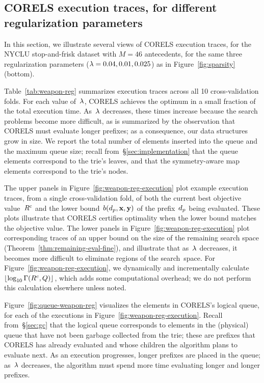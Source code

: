 \subsection{CORELS execution traces, for different regularization parameters}
\label{sec:reg-param}
In this section, we illustrate several views of CORELS execution traces,
for the NYCLU stop-and-frisk dataset with ${M = 46}$ antecedents,
for the same three regularization parameters (${{\lambda} = 0.04, 0.01, 0.025}$)
as in Figure~\ref{fig:sparsity} (bottom).

Table~\ref{tab:weapon-reg} summarizes execution traces across all 10 cross-validation folds.
%
For each value of~${\lambda}$, CORELS achieves the optimum in a small fraction of the total execution time.
%
As~${\lambda}$ decreases, these times increase because the search problems become more difficult,
as is summarized by the observation that CORELS must evaluate longer prefixes;
as a consequence, our data structures grow in size.
%
We report the total number of elements inserted into the queue and the maximum queue size;
recall from~\S\ref{sec:implementation} that the queue elements correspond to the trie's leaves,
and that the symmetry-aware map elements correspond to the trie's nodes.

The upper panels in Figure~\ref{fig:weapon-reg-execution} plot example execution traces,
from a single cross-validation fold, of both the current best objective value~${R^c}$
and the lower bound~$b(d_p, \mathbf{x}, \mathbf{y})$ of the prefix~$d_p$ being evaluated.
%
These plots illustrate that CORELS certifies optimality
when the lower bound matches the objective value.
%
The lower panels in Figure~\ref{fig:weapon-reg-execution} plot corresponding traces of
an upper bound on the size of the remaining search space (Theorem~\ref{thm:remaining-eval-fine}),
and illustrate that as~${\lambda}$ decreases, it becomes more difficult to eliminate regions of the search~space.
%
For Figure~\ref{fig:weapon-reg-execution}, we dynamically and incrementally
calculate~$\lfloor \log_{10} \Gamma({R^c}, Q) \rfloor$,
which adds some computational overhead; we do not perform this calculation elsewhere unless noted.

Figure~\ref{fig:queue-weapon-reg} visualizes the elements in CORELS's logical queue,
for each of the executions in Figure~\ref{fig:weapon-reg-execution}.
%
Recall from~\S\ref{sec:gc} that the logical queue corresponds to elements in the
(physical) queue that have not been garbage collected from the trie; these are prefixes that
CORELS has already evaluated and whose children the algorithm plans to evaluate next.
%
As an execution progresses, longer prefixes are placed in the queue;
as~${\lambda}$ decreases, the algorithm must spend more time evaluating longer and longer prefixes.

